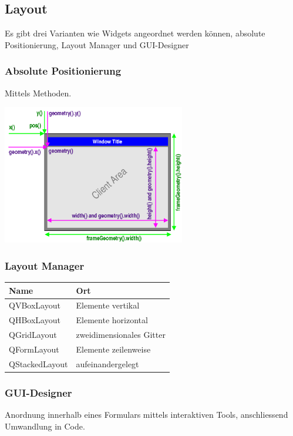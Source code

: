 \subsection{Layout}
Es gibt drei Varianten wie Widgets angeordnet werden können, absolute Positionierung, Layout Manager und GUI-Designer

\subsubsection{Absolute Positionierung}
Mittels Methoden.
\begin{multicols}{2}	
	
	
	\includegraphics[width=8cm]{images/geometry.png}
\end{multicols}

\subsubsection{Layout Manager}
	\begin{tabular}{|l|l|}
		\hline \textbf{Name} & \textbf{Ort}\\
		\hline QVBoxLayout & Elemente vertikal\\
		\hline QHBoxLayout & Elemente horizontal\\
		\hline QGridLayout & zweidimensionales Gitter\\
		\hline QFormLayout & Elemente zeilenweise\\
		\hline QStackedLayout & aufeinandergelegt\\
		\hline
	\end{tabular}
	
\subsubsection{GUI-Designer}	
	Anordnung innerhalb eines Formulars mittels interaktiven Tools, anschliessend Umwandlung in Code. 	

